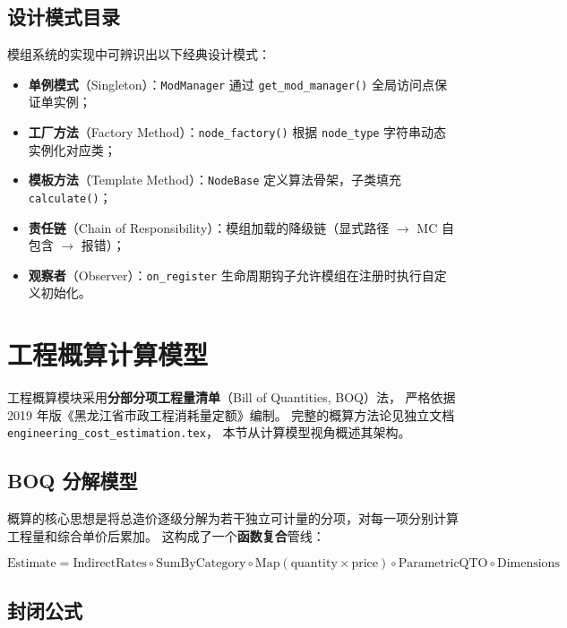 \documentclass[12pt,a4paper]{ctexart}
\theoremstyle{definition}
\theoremstyle{remark}
\begin{document}
\subsection{设计模式目录}

模组系统的实现中可辨识出以下经典设计模式：
\begin{itemize}
  \item \textbf{单例模式}（Singleton）：\texttt{ModManager} 通过 \texttt{get\_mod\_manager()} 全局访问点保证单实例；
  \item \textbf{工厂方法}（Factory Method）：\texttt{node\_factory()} 根据 \texttt{node\_type} 字符串动态实例化对应类；
  \item \textbf{模板方法}（Template Method）：\texttt{NodeBase} 定义算法骨架，子类填充 \texttt{calculate()}；
  \item \textbf{责任链}（Chain of Responsibility）：模组加载的降级链（显式路径 $\to$ MC 自包含 $\to$ 报错）；
  \item \textbf{观察者}（Observer）：\texttt{on\_register} 生命周期钩子允许模组在注册时执行自定义初始化。
\end{itemize}

\section{工程概算计算模型}

工程概算模块采用\textbf{分部分项工程量清单}（Bill of Quantities, BOQ）法，
严格依据 2019 年版《黑龙江省市政工程消耗量定额》编制。
完整的概算方法论见独立文档 \texttt{engineering\_cost\_estimation.tex}，
本节从计算模型视角概述其架构。

\subsection{BOQ 分解模型}

概算的核心思想是将总造价逐级分解为若干独立可计量的分项，对每一项分别计算工程量和综合单价后累加。
这构成了一个\textbf{函数复合}管线：

\[
\text{Estimate} = \text{IndirectRates} \circ \text{SumByCategory}
                 \circ \text{Map}(\text{quantity} \times \text{price})
                 \circ \text{ParametricQTO} \circ \text{Dimensions}
\]

\subsection{封闭公式}
\end{document}
